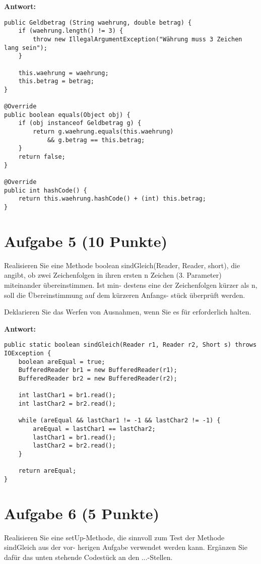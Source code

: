 \textbf{Antwort:}

\begin{lstlisting}
public Geldbetrag (String waehrung, double betrag) {
    if (waehrung.length() != 3) {
        throw new IllegalArgumentException("Währung muss 3 Zeichen lang sein");
    }

    this.waehrung = waehrung;
    this.betrag = betrag;
}

@Override
public boolean equals(Object obj) {
    if (obj instanceof Geldbetrag g) {
        return g.waehrung.equals(this.waehrung)
            && g.betrag == this.betrag;
    }
    return false;
}

@Override 
public int hashCode() {
    return this.waehrung.hashCode() + (int) this.betrag;
}
\end{lstlisting}

\section{Aufgabe 5 (10 Punkte)}
Realisieren Sie eine Methode boolean sindGleich(Reader, Reader, short), die
angibt, ob zwei Zeichenfolgen in ihren ersten n Zeichen (3. Parameter)
miteinander übereinstimmen. Ist min- destens eine der Zeichenfolgen kürzer als
n, soll die Übereinstimmung auf dem kürzeren Anfangs- stück überprüft werden.

Deklarieren Sie das Werfen von Ausnahmen, wenn Sie es für erforderlich halten.

\textbf{Antwort:}

\begin{lstlisting}
public static boolean sindGleich(Reader r1, Reader r2, Short s) throws IOException {
    boolean areEqual = true;
    BufferedReader br1 = new BufferedReader(r1);
    BufferedReader br2 = new BufferedReader(r2);

    int lastChar1 = br1.read();
    int lastChar2 = br2.read();

    while (areEqual && lastChar1 != -1 && lastChar2 != -1) {
        areEqual = lastChar1 == lastChar2;
        lastChar1 = br1.read();
        lastChar2 = br2.read();
    }

    return areEqual;
}
\end{lstlisting}

\section{Aufgabe 6 (5 Punkte)}
Realisieren Sie eine setUp-Methode, die sinnvoll zum Test der Methode
sindGleich aus der vor- herigen Aufgabe verwendet werden kann. Ergänzen Sie
dafür das unten stehende Codestück an den ...-Stellen.

